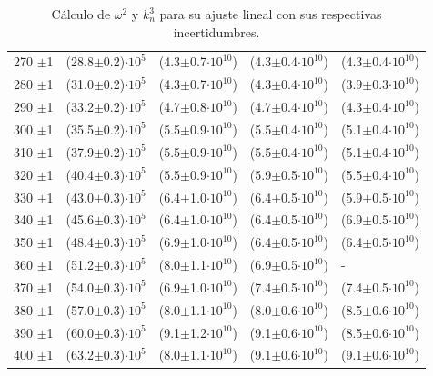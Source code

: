 \begin{table}[H]
\begin{minipage}{\textwidth}
\begin{tabular}{C{1.5cm}|C{3.4cm}| C{2.2cm}|C{2.2cm}| C{2.2cm}}
			270	$\pm$1 &	(28.8$\pm$0.2)$\cdot 10^5$ &(4.3$\pm$0.7$\cdot 10^{10}$) &(4.3$\pm$0.4$\cdot 10^{10}$) &(4.3$\pm$0.4$\cdot 10^{10}$)  \\
			280	$\pm$1 &	(31.0$\pm$0.2)$\cdot 10^5$ &(4.3$\pm$0.7$\cdot 10^{10}$) &(4.3$\pm$0.4$\cdot 10^{10}$) &(3.9$\pm$0.3$\cdot 10^{10}$)  \\
			290	$\pm$1 &	(33.2$\pm$0.2)$\cdot 10^5$ &(4.7$\pm$0.8$\cdot 10^{10}$) &(4.7$\pm$0.4$\cdot 10^{10}$) &(4.3$\pm$0.4$\cdot 10^{10}$)  \\
			300	$\pm$1 &	(35.5$\pm$0.2)$\cdot 10^5$ &(5.5$\pm$0.9$\cdot 10^{10}$) &(5.5$\pm$0.4$\cdot 10^{10}$) &(5.1$\pm$0.4$\cdot 10^{10}$)  \\
			310	$\pm$1 &	(37.9$\pm$0.2)$\cdot 10^5$ &(5.5$\pm$0.9$\cdot 10^{10}$) &(5.5$\pm$0.4$\cdot 10^{10}$) &(5.1$\pm$0.4$\cdot 10^{10}$)  \\
			320	$\pm$1 &	(40.4$\pm$0.3)$\cdot 10^5$ &(5.5$\pm$0.9$\cdot 10^{10}$) &(5.9$\pm$0.5$\cdot 10^{10}$) &(5.5$\pm$0.4$\cdot 10^{10}$)  \\
			330	$\pm$1 &	(43.0$\pm$0.3)$\cdot 10^5$ &(6.4$\pm$1.0$\cdot 10^{10}$) &(6.4$\pm$0.5$\cdot 10^{10}$) &(5.9$\pm$0.5$\cdot 10^{10}$)  \\
			340	$\pm$1 &	(45.6$\pm$0.3)$\cdot 10^5$ &(6.4$\pm$1.0$\cdot 10^{10}$) &(6.4$\pm$0.5$\cdot 10^{10}$) &(6.9$\pm$0.5$\cdot 10^{10}$)  \\
			350	$\pm$1 &	(48.4$\pm$0.3)$\cdot 10^5$ &(6.9$\pm$1.0$\cdot 10^{10}$) &(6.4$\pm$0.5$\cdot 10^{10}$) &(6.4$\pm$0.5$\cdot 10^{10}$)  \\
			360	$\pm$1 &	(51.2$\pm$0.3)$\cdot 10^5$ &(8.0$\pm$1.1$\cdot 10^{10}$) &(6.9$\pm$0.5$\cdot 10^{10}$) & -                       \\
			370	$\pm$1 &	(54.0$\pm$0.3)$\cdot 10^5$ &(6.9$\pm$1.0$\cdot 10^{10}$) &(7.4$\pm$0.5$\cdot 10^{10}$) &(7.4$\pm$0.5$\cdot 10^{10}$)  \\
			380	$\pm$1 &	(57.0$\pm$0.3)$\cdot 10^5$ &(8.0$\pm$1.1$\cdot 10^{10}$) &(8.0$\pm$0.6$\cdot 10^{10}$) &(8.5$\pm$0.6$\cdot 10^{10}$)  \\
			390	$\pm$1 &	(60.0$\pm$0.3)$\cdot 10^5$ &(9.1$\pm$1.2$\cdot 10^{10}$) &(9.1$\pm$0.6$\cdot 10^{10}$) &(8.5$\pm$0.6$\cdot 10^{10}$)  \\
			400	$\pm$1 &	(63.2$\pm$0.3)$\cdot 10^5$ &(8.0$\pm$1.1$\cdot 10^{10}$) &(9.1$\pm$0.6$\cdot 10^{10}$) &(9.1$\pm$0.6$\cdot 10^{10}$)  \\
			\bottomrule
			\bottomrule		
		\end{tabular}
		\caption{ \footnotesize Cálculo de $\omega^2$ y $k_n^3$ para su ajuste lineal con sus respectivas incertidumbres.}
		\label{tab:cks2}
	\end{minipage}
\end{table}

